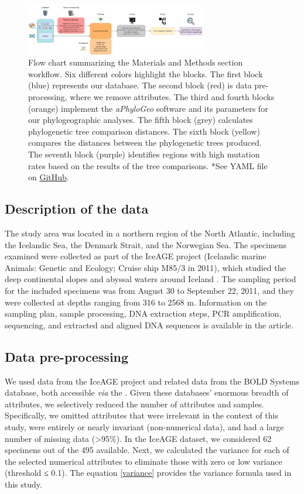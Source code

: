 \begin{figure}[htbp]
    \centering
    \includegraphics[width=0.7\textwidth]{diagram.drawio.png}
    \caption{Flow chart summarizing the Materials and Methods section workflow. Six different colors highlight the blocks. The first block (blue) represents our database. The second block (red) is data pre-processing, where we remove attributes. The third and fourth blocks (orange) implement the \textit{aPhyloGeo} software and its parameters for our phylogeographic analyses. The fifth block (grey) calculates phylogenetic tree comparison distances. The sixth block (yellow) compares the distances between the phylogenetic trees produced. The seventh block (purple) identifies regions with high mutation rates based on the results of the tree comparisons. *See YAML file on \href{https://github.com/tahiri-lab/aPhyloGeo}{GitHub}. \label{fig:fig1}}
\end{figure}

\subsection{Description of the data}
The study area was located in a northern region of the North Atlantic, including the Icelandic Sea, the Denmark Strait, and the Norwegian Sea. The specimens examined were collected as part of the IceAGE project (Icelandic marine Animals: Genetic and Ecology; Cruise ship M85/3 in 2011), which studied the deep continental slopes and abyssal waters around Iceland \citep{meisner_prefacebiodiversity_2018}. The sampling period for the included specimens was from August 30 to September 22, 2011, and they were collected at depths ranging from 316 to 2568 m. Information on the sampling plan, sample processing, DNA extraction steps, PCR amplification, sequencing, and extracted and aligned DNA sequences is available in the \citep{uhlir_adding_2021} article.

\subsection{Data pre-processing}
We used data from the IceAGE project and related data from the BOLD Systems database, both accessible \emph{via} the \citep{uhlir_adding_2021}. Given these databases' enormous breadth of attributes, we selectively reduced the number of attributes and samples. Specifically, we omitted attributes that were irrelevant in the context of this study, were entirely or nearly invariant (non-numerical data), and had a large number of missing data (>95\%). In the IceAGE dataset, we considered 62 specimens out of the 495 available. Next, we calculated the variance for each of the selected numerical attributes to eliminate those with zero or low variance (threshold ≤ 0.1). The equation \ref{variance} provides the variance formula used in this study.

